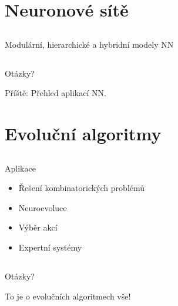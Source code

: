 \documentclass{beamer}
\begin{document}
\section{Neuronové sítě}

\subsection{}
\begin{frame}{Modulární, hierarchické a hybridní modely NN}
\end{frame}

\subsection{}
\begin{frame}{Otázky?}
\begin{center}
Příště: Přehled aplikací NN.
\end{center}
\end{frame}

\section{Evoluční algoritmy}

\subsection{}
\begin{frame}{Aplikace}
\begin{itemize}
\item Řešení kombinatorických problémů
\item Neuroevoluce
\item Výběr akcí
\item Expertní systémy
\end{itemize}
\end{frame}

\subsection{}
\begin{frame}{Otázky?}
\begin{center}
To je o evolučních algoritmech vše!
\end{center}
\end{frame}
\end{document}
